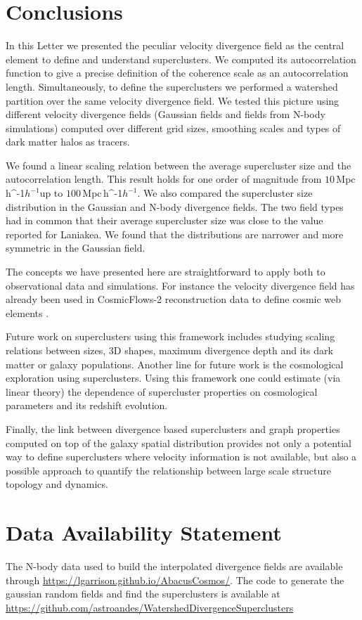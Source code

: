 \documentclass[usenatbib]{mnras}
\newcommand{\Mpch}{\,{\rm Mpc}\,\ifmmode h^{-1}\else $h^{-1}$\fi}
\begin{document}
\section{Conclusions}
\label{sec:conclusion}


In this Letter we presented the peculiar velocity divergence field as the central element to define and understand superclusters.
We computed its autocorrelation function to give a precise definition of the coherence scale as an autocorrelation length. 
Simultaneously, to define the superclusters we performed a watershed partition over the same velocity divergence field. 
We tested this picture using different velocity divergence fields (Gaussian fields and fields from N-body simulations) computed over different grid sizes, smoothing scales and types of dark matter halos as tracers.

We found a linear scaling relation between the average supercluster size and the autocorrelation length. 
This result holds for one order of magnitude from $10$\Mpch up to $100$\Mpch.
We also compared the supercluster size distribution in the Gaussian and N-body divergence fields. The two  field types had in common that their average supercluster size was close to the value reported for Laniakea.
We found that the distributions are narrower and more symmetric in the Gaussian field.


The concepts we have presented here are straightforward to apply both to observational data and simulations.
For instance the velocity divergence field has already been used in CosmicFlows-2 reconstruction data to define cosmic web elements \citep{2015MNRAS.452.1052L}. 

Future work on superclusters using this framework includes studying scaling relations between sizes, 3D shapes, maximum divergence depth and its dark matter or galaxy populations.
Another line for future work is the cosmological exploration using superclusters.
Using this framework one could estimate (via linear theory) the dependence of supercluster properties on cosmological parameters and its redshift evolution.

Finally, the link between divergence based superclusters and graph properties \citep{2020MNRAS.tmpL.153G} computed on top of the galaxy spatial distribution provides not only a potential way to define superclusters where velocity information is not available, but also a possible approach to quantify the relationship between large scale structure topology and dynamics.


\section*{Data Availability Statement}
The N-body data used to build the interpolated divergence fields are available through \url{https://lgarrison.github.io/AbacusCosmos/}. 
The code to generate the gaussian random fields and find the superclusters is available at \url{https://github.com/astroandes/WatershedDivergenceSuperclusters}



\end{document}
